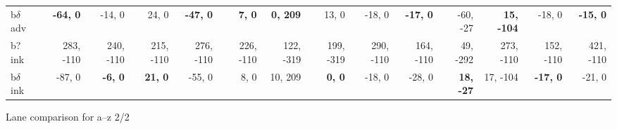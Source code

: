 \begin{table}[p]
{\begin{tabular}{lrrrrrrrrrrrrr}
b$\delta$ adv & \textbf{-64, 0} & -14, 0 & 24, 0 & \textbf{-47, 0} & \textbf{7, 0} & \textbf{0, 209} & 13, 0 & -18, 0 & \textbf{-17, 0} & -60, -27 & \textbf{15, -104} & -18, 0 & \textbf{-15, 0} \\
b? ink & 283, -110 & 240, -110 & 215, -110 & 276, -110 & 226, -110 & 122, -319 & 199, -319 & 290, -110 & 164, -110 & 49, -292 & 273, -110 & 152, -110 & 421, -110 \\
b$\delta$ ink & -87, 0 & \textbf{-6, 0} & \textbf{21, 0} & -55, 0 & 8, 0 & 10, 209 & \textbf{0, 0} & -18, 0 & -28, 0 & \textbf{18, -27} & 17, -104 & \textbf{-17, 0} & -21, 0 \\

\end{tabular}
}
\end{table}
\clearpage


\begin{table}[p]
\captionsetup{justification=raggedright, singlelinecheck=false}
\caption{Lane comparison for a--z 2/2}
\label{table:lanes_az_2}
\setlength{\tabcolsep}{3.5pt}


\end{table}
